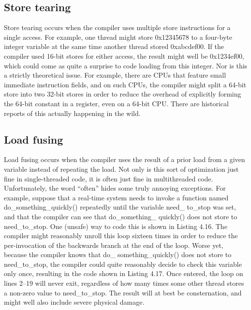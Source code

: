 \subsection{Store tearing}

Store tearing occurs when the compiler uses multiple store instructions
for a single access. For example, one thread might store 0x12345678 to 
a four-byte integer variable at the same time another thread stored
0xabcdef00. If the compiler used 16-bit stores for either access, the result
might well be 0x1234ef00, which could come as quite a surprise to code
loading from this integer. Nor is this a strictly theoretical issue. For example,
there are CPUs that feature small immediate instruction fields, and on such
CPUs, the compiler might split a 64-bit store into two 32-bit stores in order
to reduce the overhead of explicitly forming the 64-bit constant in a register,
even on a 64-bit CPU. There are historical reports of this actually happening
in the wild.


\subsection{Load fusing}

Load fusing occurs when the compiler uses the result of a prior load
from a given variable instead of repeating the load. Not only is this sort
of optimization just fine in single-threaded code, it is often just fine in
multithreaded code. Unfortunately, the word “often” hides some truly
annoying exceptions.
For example, suppose that a real-time system needs to invoke a function
named do\_something\_quickly() repeatedly until the variable need\_
to\_stop was set, and that the compiler can see that do\_something\_
quickly() does not store to need\_to\_stop. One (unsafe) way to code
this is shown in Listing 4.16. The compiler might reasonably unroll this loop
sixteen times in order to reduce the per-invocation of the backwards branch
at the end of the loop. Worse yet, because the compiler knows that do\_
something\_quickly() does not store to need\_to\_stop, the compiler
could quite reasonably decide to check this variable only once, resulting
in the code shown in Listing 4.17. Once entered, the loop on lines 2–19
will never exit, regardless of how many times some other thread stores a
non-zero value to need\_to\_stop. The result will at best be consternation,
and might well also include severe physical damage.

